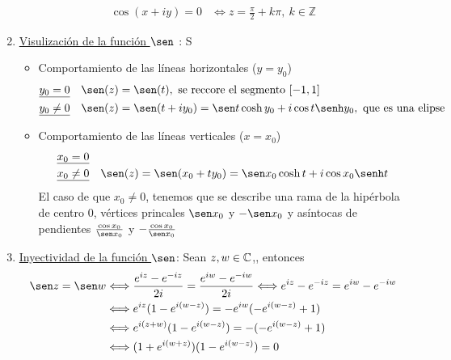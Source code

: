 \begin{enumerate}
\begin{align*}
              \cos(x + iy) = 0 & \Longleftrightarrow  z = \frac{\pi}{2} + k\pi, \ k \in \mathbb{Z}
          \end{align*}
    \item \underline{Visulización de la función $\sen$} : S
          \begin{itemize}
              \item Comportamiento de las líneas horizontales ($y = y_0$)
                    \begin{align*}
                         & \underline{y_0 = 0} \ \ \ \sen(z) = \sen(t), \text{ se reccore el segmento } [-1,1]                                       \\
                         & \underline{y_0 \not = 0} \ \ \ \sen(z) = \sen(t + iy_0) = \sen t \cosh y_0 + i\cos t \senh y_0, \text{ que es una elipse}
                    \end{align*}
              \item Comportamiento de las líneas verticales ($x = x_0$)
                    \begin{align*}
                         & \underline{x_0 = 0} \ \ \                                                                        \\
                         & \underline{x_0 \not = 0} \ \ \ \sen(z) = \sen(x_0 + ty_0) = \sen x_0 \cosh t + i\cos x_0 \senh t
                    \end{align*}
                    El caso de que $x_0 \not = 0$, tenemos que se describe una rama de la hipérbola de centro 0, vértices princales $\sen x_0 $ y $-\sen x_0$ y asíntocas de pendientes $\frac{\cos x_0}{\sen x_0}$ y $-\frac{\cos x_0}{\sen x_0}$
          \end{itemize}
    \item \underline{Inyectividad de la función $\sen$}: Sean $z,w \in \mathbb{C}$,, entonces
          \begin{align*}
              \sen z = \sen w & \Longleftrightarrow \frac{e^{iz}-e^{-iz}}{2i} = \frac{e^{iw}-e^{-iw}}{2i} \Longleftrightarrow e^{iz}-e^{-iz} = e^{iw}-e^{-iw} \\
                              & \Longleftrightarrow e^{iz}(1 - e^{i(w-z)}) = -e^{iw}(-e^{i(w-z)} + 1)                                                         \\
                              & \Longleftrightarrow e^{i(z+w)}(1 - e^{i(w-z)}) = -(-e^{i(w-z)} + 1)                                                           \\
                              & \Longleftrightarrow (1 + e^{i(w+z)})(1 - e^{i(w-z)}) = 0                                                                      \\

\end{align*}
\end{enumerate}
